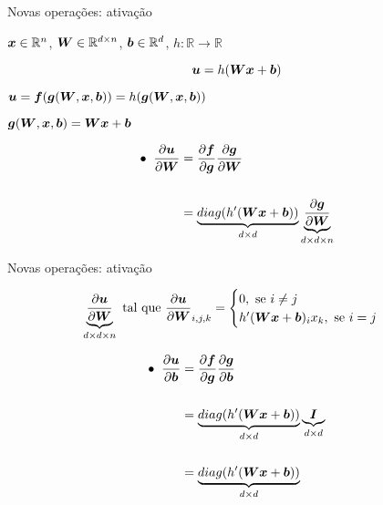 \documentclass[10pt]{beamer}
\begin{document}
\begin{frame}{Novas operações: ativação}
\large{

$\bm{x}\in \mathbb{R}^{n}$, $\bm{W} \in \mathbb{R}^{d\times n}$, $\bm{b}\in \mathbb{R}^{d}$, $h:\mathbb{R} \rightarrow \mathbb{R}$

\vspace{0.1 cm}

\begin{equation*}
\bm{u} = h(\bm{W}\bm{x} + \bm{b})
\end{equation*}

\vspace{0.1 cm}

$\bm{u} = \bm{f}(\bm{g}(\bm{W},\bm{x},\bm{b})) = h(\bm{g}(\bm{W}, \bm{x},\bm{b}))$

\vspace{0.1 cm}

$\bm{g}(\bm{W}, \bm{x}, \bm{b}) = \bm{W}\bm{x} + \bm{b}$

\vspace{0.1 cm}

\begin{align*}
\bullet \; \; \frac{\partial \bm{u}}{\partial \bm{W}} &= \frac{\partial \bm{f}}{\partial \bm{g}}\frac{\partial \bm{g}}{\partial \bm{W}}\\
&\\
&= \underbrace{diag(h^{\prime}(\bm{W}\bm{x} + \bm{b}))}_{\tiny{d \times d}} \underbrace{\frac{\partial \bm{g}}{\partial \bm{W}}}_{\tiny{d \times d \times n}}\\
\end{align*}
}
\end{frame}


\begin{frame}{Novas operações: ativação}
\large{
\begin{equation*}
\underbrace{\frac{\partial \bm{u}}{\partial \bm{W}}}_{\tiny{d \times d \times n}} \text{ tal que }  \frac{\partial \bm{u}}{\partial \bm{W}}_{i,j,k} = \begin{cases}
0, \text{ se } i \neq j\\
h^{\prime}(\bm{W}\bm{x} + \bm{b})_i x_k, \text{ se } i = j\\
\end{cases}
\end{equation*}

\begin{align*}
\bullet \; \; \frac{\partial \bm{u}}{\partial \bm{b}} &= \frac{\partial \bm{f}}{\partial \bm{g}}\frac{\partial \bm{g}}{\partial \bm{b}}\\
&\\
&= \underbrace{diag(h^{\prime}(\bm{W}\bm{x} + \bm{b}))}_{\tiny{d \times d}} \underbrace{\bm{I}}_{\tiny{d \times d}}\\
&\\
&= \underbrace{diag(h^{\prime}(\bm{W}\bm{x} + \bm{b}))}_{\tiny{d \times d}}\\
\end{align*}
}
\end{frame}
\end{document}
